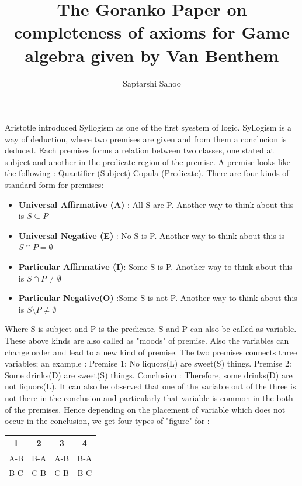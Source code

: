 \documentclass[10pt]{article}
\title{The \textbf{Goranko Paper} on completeness of axioms for Game algebra given by Van Benthem}
\author{Saptarshi Sahoo}
\begin{document}
	\maketitle
	
	Aristotle introduced Syllogism as one of the first syestem of logic. Syllogism is a way of deduction, where two premises are given and from them a conclucion is deduced. Each premises forms a relation between two classes, one stated at subject and another in the predicate region of the premise. A premise looks like the following : Quantifier (Subject) Copula (Predicate). There are four kinds of standard form for premises:
	
	\begin{itemize}
		\item  \textbf{Universal Affirmative (A)} : All S are P. Another way to think about this is $S \subseteq P$
		\item \textbf{Universal Negative (E)} : No S is P. Another way to think about this is $S \cap P = \emptyset$
		\item \textbf{Particular Affirmative (I)}: Some S is P. Another way to think about this is $S \cap P \ne \emptyset$
		\item \textbf{Particular Negative(O)} :Some S is not P. Another way to think about this is $S \setminus P \ne \emptyset$
	\end{itemize}
	Where S is subject and P is the predicate. S and P can also be called as variable. These above kinds are also called as "moods" of premise. Also the variables can change order and lead to a new kind of premise. The two premises connects three variables; an example : Premise 1: No liquors(L) are sweet(S) things. Premise 2: Some drinks(D) are sweet(S) things. Conclusion : Therefore, some drinks(D) are not liquors(L). It can also be observed that one of the variable out of the three is not there in the conclusion and particularly that variable is common in the both of the premises. Hence depending on the placement of variable which does not occur in the conclusion, we get four types of "figure" for : 
	
	\begin{tabular}{c c c c}
		1 &2 &3&4 \\
		\hline
		A-B & B-A &A-B & B-A \\
		B-C & C-B & C-B  & B-C \\
	\end{tabular}
\end{document}
